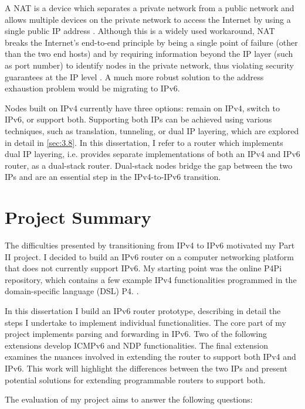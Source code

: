 A NAT is a device which separates a private network from a public network and allows multiple devices on the private network to access the Internet by using a single public IP address \cite{NAT}. Although this is a widely used workaround, NAT breaks the Internet's end-to-end principle by being a single point of failure (other than the two end hosts) and by requiring information beyond the IP layer (such as port number) to identify nodes in the private network, thus violating security guarantees at the IP level \cite{NATSpecs}. A much more robust solution to the address exhaustion problem would be migrating to IPv6.

Nodes built on IPv4 currently have three options: remain on IPv4, switch to IPv6, or support both. Supporting both IPs can be achieved using various techniques, such as translation, tunneling, or dual IP layering, which are explored in detail in \cref{sec:3.8}. In this dissertation, I refer to a router which implements dual IP layering, i.e. provides separate implementations of both an IPv4 and IPv6 router, as a dual-stack router. Dual-stack nodes bridge the gap between the two IPs and are an essential step in the IPv4-to-IPv6 transition.


\section{Project Summary}
\label{sec:1.1}
The difficulties presented by transitioning from IPv4 to IPv6 motivated my Part II project. I decided to build an IPv6 router on a computer networking platform that does not currently support IPv6. My starting point was the online P4Pi repository, which contains a few example IPv4 functionalities programmed in the domain-specific language (DSL) P4. \cite{P4Pi}. 

In this dissertation I build an IPv6 router prototype, describing in detail the steps I undertake to implement individual functionalities. The core part of my project implements parsing and forwarding in IPv6. Two of the following extensions develop ICMPv6 and NDP functionalities. The final extension examines the nuances involved in extending the router to support both IPv4 and IPv6. This work will highlight the differences between the two IPs and present potential solutions for extending programmable routers to support both.

The evaluation of my project aims to answer the following questions:


